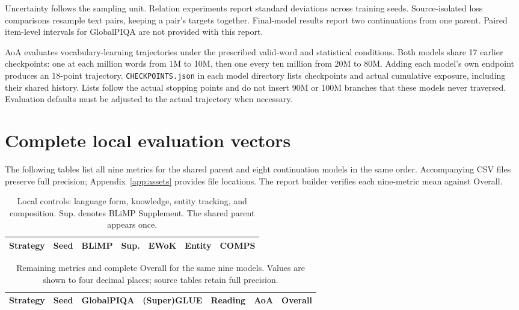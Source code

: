 Uncertainty follows the sampling unit. Relation experiments report standard deviations across training seeds. Source-isolated loss comparisons resample text pairs, keeping a pair's targets together. Final-model results report two continuations from one parent. Paired item-level intervals for GlobalPIQA are not provided with this report.

AoA evaluates vocabulary-learning trajectories under the prescribed valid-word and statistical conditions. Both models share 17 earlier checkpoints: one at each million words from 1M to 10M, then one every ten million from 20M to 80M. Adding each model's own endpoint produces an 18-point trajectory. \nolinkurl{CHECKPOINTS.json} in each model directory lists checkpoints and actual cumulative exposure, including their shared history. Lists follow the actual stopping points and do not insert 90M or 100M branches that these models never traversed. Evaluation defaults must be adjusted to the actual trajectory when necessary.

\par\FloatBarrier{}
\section{Complete local evaluation vectors}
\label{app:local}

The following tables list all nine metrics for the shared parent and eight continuation models in the same order. Accompanying CSV files preserve full precision; Appendix~\ref{app:assets} provides file locations. The report builder verifies each nine-metric mean against Overall.

\begin{table}[htbp]
\caption{Local controls: language form, knowledge, entity tracking, and composition. Sup. denotes BLiMP Supplement. The shared parent appears once.}
\label{tab:local_a}
\scriptsize\setlength{\tabcolsep}{3pt}
\begin{tabularx}{\linewidth}{@{}Yrrrrrr@{}}
\toprule Strategy & Seed & BLiMP & Sup. & EWoK & Entity & COMPS\\\midrule

\end{tabularx}
\end{table}

\begin{table}[htbp]
\caption{Remaining metrics and complete Overall for the same nine models. Values are shown to four decimal places; source tables retain full precision.}
\label{tab:local_b}
\scriptsize\setlength{\tabcolsep}{3pt}
\begin{tabularx}{\linewidth}{@{}Yrrrrrr@{}}
\toprule Strategy & Seed & GlobalPIQA & (Super)GLUE & Reading & AoA & Overall\\\midrule

\end{tabularx}
\end{table}

